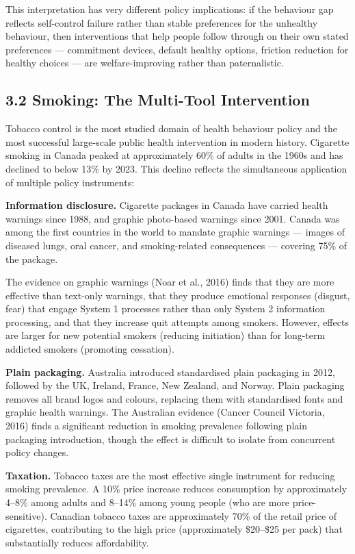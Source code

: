 \documentclass[12pt, letterpaper]{article}
\begin{document}
This interpretation has very different policy implications: if the behaviour gap reflects self-control failure rather than stable preferences for the unhealthy behaviour, then interventions that help people follow through on their own stated preferences --- commitment devices, default healthy options, friction reduction for healthy choices --- are welfare-improving rather than paternalistic.


\subsection{3.2 Smoking: The Multi-Tool Intervention}


Tobacco control is the most studied domain of health behaviour policy and the most successful large-scale public health intervention in modern history. Cigarette smoking in Canada peaked at approximately 60\% of adults in the 1960s and has declined to below 13\% by 2023. This decline reflects the simultaneous application of multiple policy instruments:

\textbf{Information disclosure.} Cigarette packages in Canada have carried health warnings since 1988, and graphic photo-based warnings since 2001. Canada was among the first countries in the world to mandate graphic warnings --- images of diseased lungs, oral cancer, and smoking-related consequences --- covering 75\% of the package.

The evidence on graphic warnings (Noar et al., 2016) finds that they are more effective than text-only warnings, that they produce emotional responses (disgust, fear) that engage System 1 processes rather than only System 2 information processing, and that they increase quit attempts among smokers. However, effects are larger for new potential smokers (reducing initiation) than for long-term addicted smokers (promoting cessation).

\textbf{Plain packaging.} Australia introduced standardised plain packaging in 2012, followed by the UK, Ireland, France, New Zealand, and Norway. Plain packaging removes all brand logos and colours, replacing them with standardised fonts and graphic health warnings. The Australian evidence (Cancer Council Victoria, 2016) finds a significant reduction in smoking prevalence following plain packaging introduction, though the effect is difficult to isolate from concurrent policy changes.

\textbf{Taxation.} Tobacco taxes are the most effective single instrument for reducing smoking prevalence. A 10\% price increase reduces consumption by approximately 4--8\% among adults and 8--14\% among young people (who are more price-sensitive). Canadian tobacco taxes are approximately 70\% of the retail price of cigarettes, contributing to the high price (approximately \$20--\$25 per pack) that substantially reduces affordability.
\end{document}
